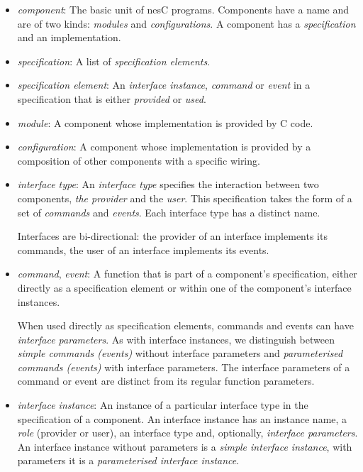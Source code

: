 \documentclass[11pt]{article}
\newcommand{\nesc}{nesC\xspace}
\begin{document}
\begin{itemize}

\item \emph{component}: The basic unit of \nesc programs. Components have a
name and are of two kinds: \emph{modules} and \emph{configurations}. A
component has a \emph{specification} and an implementation. 

\item \emph{specification}: A list of \emph{specification elements}.

\item \emph{specification element}: An \emph{interface instance},
\emph{command} or \emph{event} in a specification that is either 
\emph{provided} or \emph{used}.

\item \emph{module}: A component whose implementation is provided by C code. 

\item \emph{configuration}: A component whose implementation is provided
by a composition of other components with a specific wiring.

\item \emph{interface type}: An \emph{interface type} specifies the
interaction between two components, \emph{the provider} and the
\emph{user}. This specification takes the form of a set of \emph{commands}
and \emph{events}. Each interface type has a distinct name. 

Interfaces are bi-directional: the provider of an interface implements its
commands, the user of an interface implements its events.

\item \emph{command}, \emph{event}: A function that is part of a component's
specification, either directly as a specification element or within one 
of the component's interface instances.

When used directly as specification elements, commands and events can have
\emph{interface parameters}. As with interface instances, we distinguish
between \emph{simple commands (events)} without interface parameters and
\emph{parameterised commands (events)} with interface parameters. The
interface parameters of a command or event are distinct from its regular
function parameters.


\item \emph{interface instance}: An instance of a particular interface type
in the specification of a component. An interface instance has an instance
name, a \emph{role} (provider or user), an interface type and, optionally,
\emph{interface parameters}. An interface instance without parameters is a
\emph{simple interface instance}, with parameters it is a
\emph{parameterised interface instance}.


\end{itemize}
\end{document}
